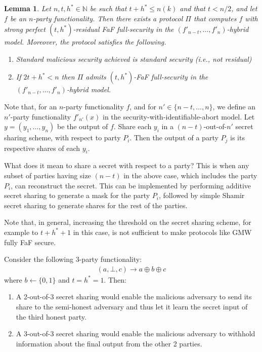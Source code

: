 \documentclass[11pt, a4paper]{article}
\newtheorem{lemma}[theorem]{Lemma}
\theoremstyle{definition}
\theoremstyle{remark}
\begin{document}
\begin{lemma}
Let $n,t,h^*\in\mathbb{N}$ be such that $t+h^*\leq n(k)$ and that $t < n/2$, and let $f$ be an $n$-party
functionality. Then there exists a protocol $\Pi$ that computes $f$ with strong perfect $(t, h^*)$-residual
FaF full-security in the $(f'_{n-t},\dots,f'_n)$-hybrid model. Moreover, the protocol satisfies the following.
\begin{enumerate}
    \item Standard malicious security achieved is standard security (i.e., not residual)
    \item If $2t + h^* < n$ then $\Pi$ admits $(t, h^*)$-FaF full-security in the $(f'_{n-t},\dots,f'_n)$-hybrid model.
\end{enumerate}
\end{lemma}

Note that, for an $n$-party functionality $f$, and for $n'\in\{n-t,\dots,n\}$, we define an $n'$-party functionality $f'_{n'}(x)$ in the security-with-identifiable-abort model. Let $y=(y_1,\dots,y_n)$ be the output of $f$. Share each $y_i$ in a $(n-t)$-out-of-$n'$ secret sharing scheme, with respect to party $P_i$. Then the output of a party $P_j$ is its respective shares of each $y_i$.

\medskip

What does it mean to share a secret with respect to a party? This is when any subset of parties having size $(n-t)$ in the above case, which includes the party $P_i$, can reconstruct the secret. This can be implemented by performing additive secret sharing to generate a mask for the party $P_i$, followed by simple Shamir secret sharing to generate shares for the rest of the parties.

\medskip

Note that, in general, increasing the threshold on the secret sharing scheme, for example to $t+h^*+1$ in this case, is not sufficient to make protocols like GMW fully FaF secure.

\medskip

Consider the following 3-party functionality:
\begin{align*}
    (a, \bot, c) \rightarrow a\oplus b\oplus c
\end{align*}
where $b\leftarrow\{0,1\}$ and $t=h^*=1$. Then:
\begin{enumerate}
    \item A 2-out-of-3 secret sharing would enable the malicious adversary to send its share to the semi-honest adversary and thus let it learn the secret input of the third honest party.
    \item A 3-out-of-3 secret sharing would enable the malicious adversary to withhold information about the final output from the other 2 parties.
\end{enumerate}
\end{document}
